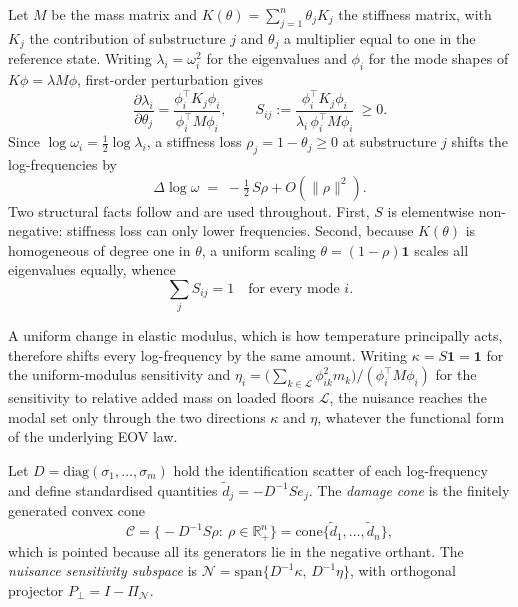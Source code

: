 \documentclass[12pt,a4paper]{article}
\newcommand{\R}{\mathbb{R}}
\newcommand{\Cone}{\mathcal{C}}
\begin{document}
Let $M$ be the mass matrix and $K(\theta)=\sum_{j=1}^{n}\theta_j K_j$ the stiffness matrix, with $K_j$ the contribution of substructure $j$ and $\theta_j$ a multiplier equal to one in the reference state. Writing $\lambda_i=\omega_i^2$ for the eigenvalues and $\phi_i$ for the mode shapes of $K\phi=\lambda M\phi$, first-order perturbation gives
\begin{equation}
\frac{\partial \lambda_i}{\partial \theta_j}=\frac{\phi_i^\top K_j \phi_i}{\phi_i^\top M \phi_i},
\qquad
S_{ij}:=\frac{\phi_i^\top K_j \phi_i}{\lambda_i\,\phi_i^\top M \phi_i}\ \ge 0 .
\label{eq:sens}
\end{equation}
Since $\log\omega_i=\tfrac12\log\lambda_i$, a stiffness loss $\rho_j=1-\theta_j\ge0$ at substructure $j$ shifts the log-frequencies by
\begin{equation}
\Delta \log \omega \;=\; -\tfrac{1}{2}\,S\rho + O(\|\rho\|^2).
\label{eq:shift}
\end{equation}
Two structural facts follow and are used throughout. First, $S$ is elementwise non-negative: stiffness loss can only lower frequencies. Second, because $K(\theta)$ is homogeneous of degree one in $\theta$, a uniform scaling $\theta=(1-\rho)\mathbf{1}$ scales all eigenvalues equally, whence
\begin{equation}
\textstyle\sum_{j} S_{ij}=1 \quad\text{for every mode } i .
\label{eq:rowsum}
\end{equation}

A uniform change in elastic modulus, which is how temperature principally acts, therefore shifts every log-frequency by the same amount. Writing $\kappa=S\mathbf{1}=\mathbf{1}$ for the uniform-modulus sensitivity and $\eta_i=\big(\sum_{k\in\mathcal{L}}\phi_{ik}^2 m_k\big)/(\phi_i^\top M\phi_i)$ for the sensitivity to relative added mass on loaded floors $\mathcal{L}$, the nuisance reaches the modal set only through the two directions $\kappa$ and $\eta$, whatever the functional form of the underlying EOV law.

Let $D=\mathrm{diag}(\sigma_1,\dots,\sigma_m)$ hold the identification scatter of each log-frequency and define standardised quantities $\tilde d_j=-D^{-1}S e_j$. The \emph{damage cone} is the finitely generated convex cone
\begin{equation}
\Cone=\Big\{-D^{-1}S\rho:\ \rho\in\R^n_{+}\Big\}
=\mathrm{cone}\{\tilde d_1,\dots,\tilde d_n\},
\label{eq:cone}
\end{equation}
which is pointed because all its generators lie in the negative orthant. The \emph{nuisance sensitivity subspace} is $\mathcal{N}=\mathrm{span}\{D^{-1}\kappa,\,D^{-1}\eta\}$, with orthogonal projector $P_\perp=I-\Pi_{\mathcal{N}}$.
\end{document}
